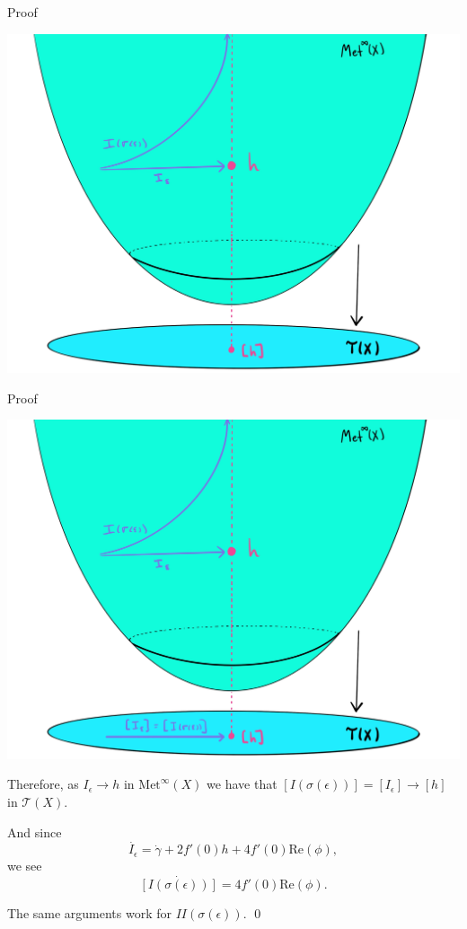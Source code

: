 \documentclass[professionalfont]{beamer}
\newcommand{\two}{I\!I}
\begin{document}
\begin{frame}{Proof}

\centering\includegraphics[scale=0.09]{Teich-4.jpg}

\end{frame}




\begin{frame}{Proof}

\centering\includegraphics[scale=0.09]{Teich-5.jpg}

\end{frame}




\begin{frame}


Therefore, as $I_\epsilon \to h$ in $\mathrm{Met}^\infty(X)$ we have that $[I(\sigma(\epsilon))] = [I_\epsilon] \to [h]$ in $\mathcal{T}(X)$. \pause

\vspace{0.5cm}
 
And since
\[
\dot{I_\epsilon}  = \dot{\gamma} + 2 f'(0) h + 4 f'(0) \mathrm{Re}(\phi), 
\]
we see
\[
\dot{[I(\sigma(\epsilon))]} = 4f'(0)\mathrm{Re}(\phi).
\] \pause

The same arguments work for $\two(\sigma(\epsilon))$. \qed

\end{frame}
\end{document}
